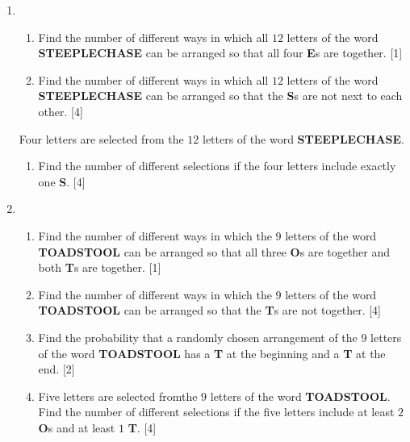 \begin{enumerate}


\item  \begin{enumerate}[label=(\roman*)]
	\item Find the number of different ways in which all $12$ letters of the word \textbf{STEEPLECHASE} can be arranged so that all four \textbf{E}s are together. \hfill[1]
	\item Find the number of different ways in which all $12$ letters of the word \textbf{STEEPLECHASE} can be arranged so that the \textbf{S}s are not next to each other. \hfill [4]
\end{enumerate}
	Four letters are selected from the $12$ letters of the word \textbf{STEEPLECHASE}.
	\begin{enumerate}[resume,label=(\roman*)]
		\item Find the number of different selections if the four letters include exactly one \textbf{S}. \hfill[4]
	\end{enumerate}



\item  \begin{enumerate}[label=(\roman*)]
	\item Find the number of different ways in which the $9$ letters of the word \textbf{TOADSTOOL} can be	arranged so that all three \textbf{O}s are together and both \textbf{T}s are together. \hfill[1]
	\item Find the number of different ways in which the $9$ letters of the word \textbf{TOADSTOOL} can be arranged so that the \textbf{T}s are not together. \hfill[4]
	\item  Find the probability that a randomly chosen arrangement of the $9$ letters of the word \textbf{TOADSTOOL}	has a \textbf{T} at the beginning and a \textbf{T} at the end. \hfill[2]
	\item Five letters are selected fromthe $9$ letters of the word \textbf{TOADSTOOL}. Find the number of different selections if the five letters include at least $2$ \textbf{O}s and at least $1$ \textbf{T}. \hfill[4]
\end{enumerate}





\end{enumerate}
